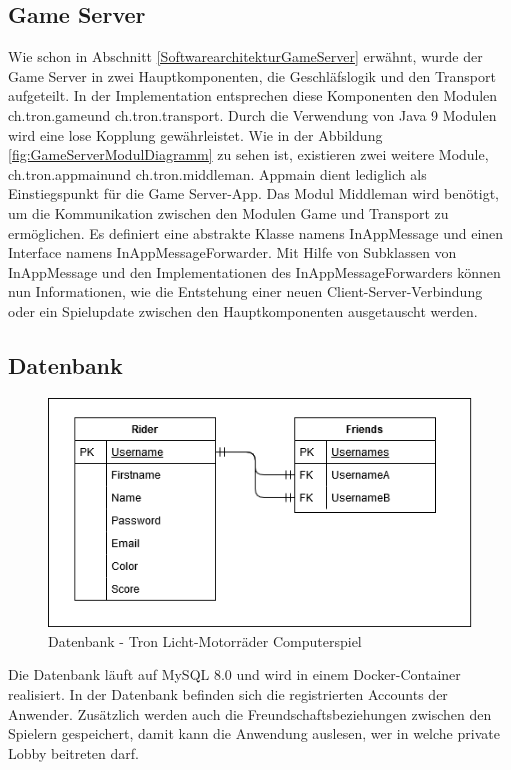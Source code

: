 \documentclass[11pt,ngerman]{article}
\begin{document}
    \subsection{\Gls{Game Server}}
    Wie schon in Abschnitt \ref{SoftwarearchitekturGameServer} erwähnt, wurde der \Gls{Game Server} in zwei Hauptkomponenten, die Geschläfslogik und den Transport aufgeteilt. In der Implementation entsprechen diese Komponenten den Modulen \dq ch.tron.game\dq und \dq ch.tron.transport\dq. Durch die Verwendung von Java 9 Modulen wird eine lose Kopplung gewährleistet. Wie in der Abbildung \ref{fig:GameServerModulDiagramm} zu sehen ist, existieren zwei weitere Module, \dq ch.tron.appmain\dq und \dq ch.tron.middleman\dq. Appmain dient lediglich als Einstiegspunkt für die \Gls{Game Server}-App. Das Modul Middleman wird benötigt, um die Kommunikation zwischen den Modulen Game und Transport zu ermöglichen. Es definiert eine abstrakte Klasse namens InAppMessage und einen Interface namens InAppMessageForwarder. Mit Hilfe von Subklassen von InAppMessage und den Implementationen des InAppMessageForwarders können nun Informationen, wie die Entstehung einer neuen Client-Server-Verbindung oder ein Spielupdate zwischen den Hauptkomponenten ausgetauscht werden.

    \subsection{Datenbank}
    \begin{figure}[H]
    	\includegraphics[scale=0.7]{figures/erm.png}
    	\caption{Datenbank - Tron Licht-Motorräder Computerspiel}
    \end{figure}
	Die Datenbank läuft auf MySQL 8.0 und wird in einem Docker-Container realisiert. In der Datenbank befinden sich die registrierten Accounts der Anwender. Zusätzlich werden auch die Freundschaftsbeziehungen zwischen den Spielern gespeichert, damit kann die Anwendung auslesen, wer in welche private \Gls{Lobby} beitreten darf.
\end{document}
